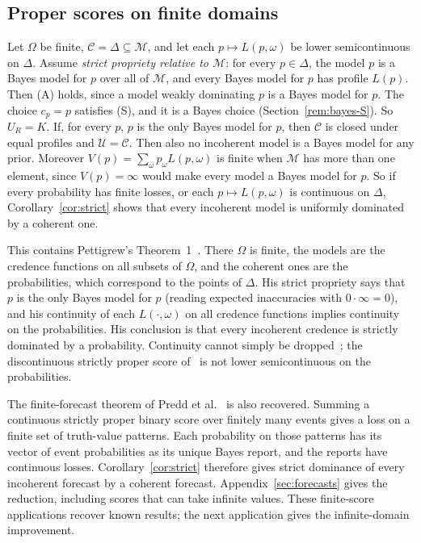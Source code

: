 \documentclass[11pt]{article}
\theoremstyle{definition}
\theoremstyle{remark}
\newcommand{\M}{\mathcal M}
\newcommand{\C}{\mathcal C}
\newcommand{\U}{\mathcal U}
\begin{document}
\subsection{Proper scores on finite domains}\label{sec:proper}
Let $\Omega$ be finite, $\C=\Delta\subseteq\M$, and let each $p\mapsto L(p,\omega)$ be lower semicontinuous on $\Delta$. Assume \emph{strict propriety relative to $\M$}: for every $p\in\Delta$, the model $p$ is a Bayes model for $p$ over all of $\M$, and every Bayes model for $p$ has profile $L(p)$. Then (A) holds, since a model weakly dominating $p$ is a Bayes model for $p$. The choice $c_p=p$ satisfies (S), and it is a Bayes choice (Section~\ref{rem:bayes-S}). So $U_R=K$. If, for every $p$, $p$ is the only Bayes model for $p$, then $\C$ is closed under equal profiles and $\U=\C$. Then also no incoherent model is a Bayes model for any prior. Moreover $V(p)=\sum_\omega p_\omega L(p,\omega)$ is finite when $\M$ has more than one element, since $V(p)=\infty$ would make every model a Bayes model for $p$. So if every probability has finite losses, or each $p\mapsto L(p,\omega)$ is continuous on $\Delta$, Corollary~\ref{cor:strict} shows that every incoherent model is uniformly dominated by a coherent one.

This contains Pettigrew's Theorem~1~\cite{Pettigrew}. There $\Omega$ is finite, the models are the credence functions on all subsets of $\Omega$, and the coherent ones are the probabilities, which correspond to the points of $\Delta$. His strict propriety says that $p$ is the only Bayes model for $p$ (reading expected inaccuracies with $0\cdot\infty=0$), and his continuity of each $L(\cdot,\omega)$ on all credence functions implies continuity on the probabilities. His conclusion is that every incoherent credence is strictly dominated by a probability. Continuity cannot simply be dropped~\cite{SSK09}; the discontinuous strictly proper score of~\cite[Example~4]{SSK09} is not lower semicontinuous on the probabilities.

The finite-forecast theorem of Predd et al.~\cite[Theorem~1]{Predd} is also recovered. Summing a continuous strictly proper binary score over finitely many events gives a loss on a finite set of truth-value patterns. Each probability on those patterns has its vector of event probabilities as its unique Bayes report, and the reports have continuous losses. Corollary~\ref{cor:strict} therefore gives strict dominance of every incoherent forecast by a coherent forecast. Appendix~\ref{sec:forecasts} gives the reduction, including scores that can take infinite values. These finite-score applications recover known results; the next application gives the infinite-domain improvement.
\end{document}
